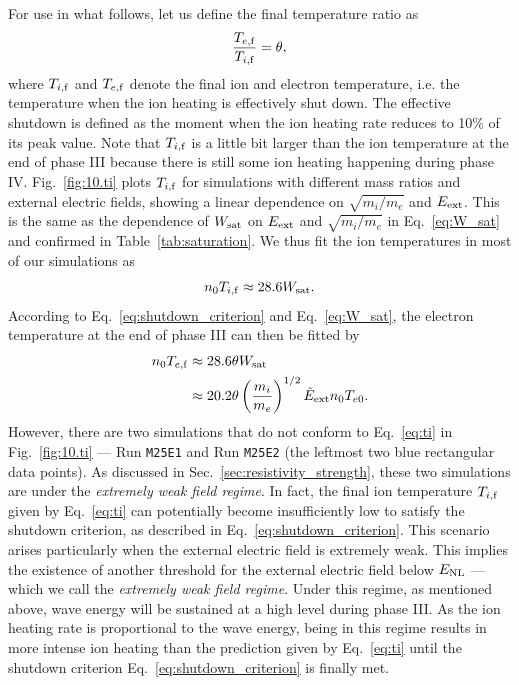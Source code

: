 \documentclass[%
 reprint,
 amsmath,
 amssymb,
 aps,
 prx,
floatfix,
superscriptaddress
]{revtex4-2}
\begin{document}
For use in what follows, let us define the final temperature ratio as
\begin{equation}
    \label{eq:shutdown_criterion}
    \frac{T_{e,\rm{f}}}{T_{i,\rm{f}}} = \theta,
\end{equation} 
where $T_{i,\rm{f}}$ and $T_{e,\rm{f}}$ denote the final ion and electron temperature, i.e. the temperature when the ion heating is effectively shut down.
The effective shutdown is defined as the moment when the ion heating rate reduces to 10\% of its peak value.
Note that $T_{i,\rm{f}}$ is a little bit larger than the ion temperature at the end of phase III because there is still some ion heating happening during phase IV.
Fig.~\ref{fig:10.ti} plots $T_{i,\rm{f}}$ for simulations with different mass ratios and external electric fields, showing a linear dependence on $\sqrt{m_i/m_e}$ and $E_{\rm{ext}}$.
This is the same as the dependence of $W_{\rm{sat}}$ on $E_{\rm{ext}}$ and $\sqrt{m_i/m_e}$ in Eq.~\eqref{eq:W_sat} and confirmed in Table~\ref{tab:saturation}.
We thus fit the ion temperatures in most of our simulations as
\begin{equation}
    \label{eq:ti}
   n_0 T_{i,\rm{f}}  \approx 28.6 W_{\rm sat} .
\end{equation}
According to Eq.~\eqref{eq:shutdown_criterion} and Eq.~\eqref{eq:W_sat}, the electron temperature at the end of phase III can then be fitted by
\begin{equation}
\label{eq:te}
\begin{split}
n_0T_{e,\rm{f}} &\approx 28.6 \theta W_{\rm sat} \\
 &\approx 20.2 \theta\left(\frac{m_i}{m_e}\right)^{1/2} \tilde{E}_{\rm{ext}} n_0T_{e0}.
\end{split}
\end{equation}
However, there are two simulations that do not conform to Eq.~\eqref{eq:ti} in Fig.~\ref{fig:10.ti} --- Run {\tt M25E1} and Run {\tt M25E2} (the leftmost two blue rectangular data points).
As discussed in Sec.~\ref{sec:resistivity_strength}, these two simulations are under the {\it extremely weak field regime}.
In fact, the final ion temperature $T_{i, \rm{f}}$ given by Eq.~\eqref{eq:ti} can potentially become insufficiently low to satisfy the shutdown criterion, as described in Eq.~\eqref{eq:shutdown_criterion}. This scenario arises particularly when the external electric field is extremely weak.
This implies the existence of another threshold for the external electric field below $E_{\rm NL}$ --- which we call the {\it extremely weak field regime}.
Under this regime, as mentioned above, wave energy will be sustained at a high level during phase III. As the ion heating rate is proportional to the wave energy, being in this regime results in more intense ion heating than the prediction given by Eq.~\eqref{eq:ti} until the shutdown criterion Eq.~\eqref{eq:shutdown_criterion} is finally met.
\end{document}
